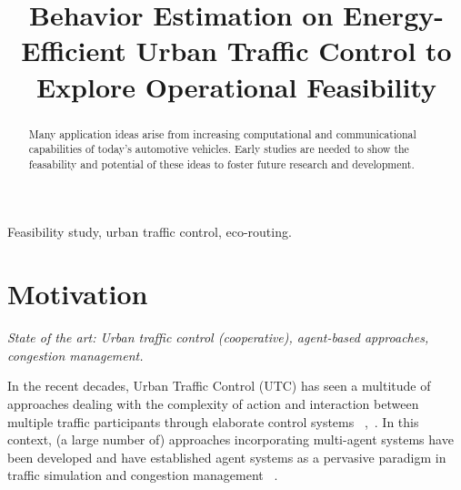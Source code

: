 \documentclass[conference]{../cls/IEEEtran}
\begin{document}
\title{Behavior Estimation on Energy-Efficient Urban Traffic Control to Explore
Operational Feasibility}

\author{
	\and
}

\maketitle

\begin{abstract}
Many application ideas arise from increasing computational and communicational capabilities of today's automotive vehicles.
Early studies are needed to show the feasability and potential of these ideas to foster future research and development.
\end{abstract}

\begin{IEEEkeywords}
Feasibility study, urban traffic control, eco-routing.
\end{IEEEkeywords}

\section{Motivation}

\textit{State of the art: Urban traffic control (cooperative), agent-based
approaches, congestion management.}

In the recent decades, Urban Traffic Control (UTC) has seen a multitude of
approaches dealing with the complexity of action and interaction between
multiple traffic participants through elaborate control systems
~\cite{Roozemond1999},~\cite{Chen2010}.
In this context, (a large number of) approaches incorporating multi-agent
systems have been developed and have established agent systems as a pervasive
paradigm in traffic simulation and congestion management ~\cite{Chen2010}.
\end{document}

